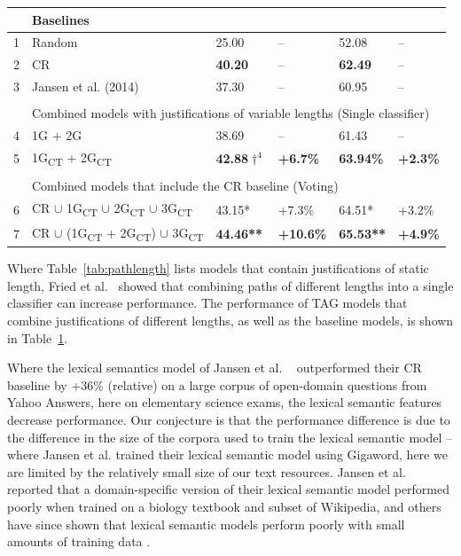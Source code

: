 {\begin{table}[t]
\begin{center}
\begin{tabular}{p{0.3mm}p{55mm}llll}
\hline
& \multicolumn{5}{l}{Baselines }\\
\hline
1 & Random					& 25.00 			& --		& 52.08  		& --	  \\
2 & CR 						& {\bf 40.20} 	& -- 	& {\bf 62.49}	&	--  \\
3 & Jansen et al. (2014)		& 37.30 			& --		& 60.95 			& 	--	 \\

\\
\hline
& \multicolumn{5}{l}{Combined models with justifications of variable lengths (Single classifier)}\\
\hline
4 & 1G + 2G										& 38.69			& --		& 61.43  	& --  \\
5 & 1G\textsubscript{CT} + 2G\textsubscript{CT} 	& {\bf 42.88$\dagger ^4$}	& {\bf +6.7\%}		& {\bf 63.94\%}  	& {\bf +2.3\%}	  \\

\\
\hline
& \multicolumn{5}{l}{Combined models that include the CR baseline (Voting)}\\
\hline
6 & CR $\cup$ 1G\textsubscript{CT} $\cup$ 2G\textsubscript{CT} $\cup$ 3G\textsubscript{CT} 			& 43.15*			& +7.3\%			& 64.51*		& +3.2\%	  \\
7 & CR $\cup$ (1G\textsubscript{CT} + 2G\textsubscript{CT}) $\cup$ 3G\textsubscript{CT} 			& {\bf 44.46**}		& {\bf +10.6\%}		& {\bf 65.53**} 		& {\bf +4.9\%}	  \\

\hline
\end{tabular}
\label{tab:combinedmodels}
\end{center}
\end{table}

Where Table~\ref{tab:pathlength} lists models that contain justifications of static length, Fried et al.~\citeyear{fried2015higher} showed that combining paths of different lengths into a single classifier can increase performance.  The performance of TAG models that combine justifications of different lengths, as well as the baseline models, is shown in Table~\ref{tab:combinedmodels}.

{} Where the lexical semantics model of Jansen et al. ~\citeyear{jansen14} outperformed their CR baseline by +36\% (relative) on a large corpus of open-domain questions from Yahoo Answers, here on elementary science exams, the lexical semantic features decrease performance.  Our conjecture is that the performance difference is due to the difference in the size of the corpora used to train the lexical semantic model -- where Jansen et al. trained their lexical semantic model using Gigaword, here we are limited by the relatively small size of our text resources.  Jansen et al. ~\citeyear{jansen14} reported that a domain-specific version of their lexical semantic model performed poorly when trained on a biology textbook and subset of Wikipedia, and others have since shown that lexical semantic models perform poorly with small amounts of training data \cite{sharp-EtAl:2015:NAACL-HLT}. 

}
